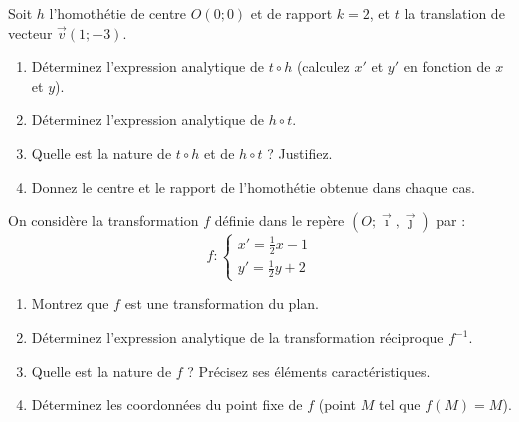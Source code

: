 \documentclass[11pt]{article}
\begin{document}
\begin{exercice}
Soit $h$ l'homothétie de centre $O(0;0)$ et de rapport $k=2$, et $t$ la translation de vecteur $\vec{v}(1;-3)$.
\begin{enumerate}
    \item Déterminez l'expression analytique de $t \circ h$ (calculez $x'$ et $y'$ en fonction de $x$ et $y$).
    \item Déterminez l'expression analytique de $h \circ t$.
    \item Quelle est la nature de $t \circ h$ et de $h \circ t$ ? Justifiez.
    \item Donnez le centre et le rapport de l'homothétie obtenue dans chaque cas.
\end{enumerate}
\end{exercice}

\begin{exercice}
On considère la transformation $f$ définie dans le repère $(O;\vec{\imath},\vec{\jmath})$ par :
$$f : \begin{cases} x' = \frac{1}{2}x - 1 \\ y' = \frac{1}{2}y + 2 \end{cases}$$
\begin{enumerate}
    \item Montrez que $f$ est une transformation du plan.
    \item Déterminez l'expression analytique de la transformation réciproque $f^{-1}$.
    \item Quelle est la nature de $f$ ? Précisez ses éléments caractéristiques.
    \item Déterminez les coordonnées du point fixe de $f$ (point $M$ tel que $f(M)=M$).
\end{enumerate}
\end{exercice}
\end{document}
